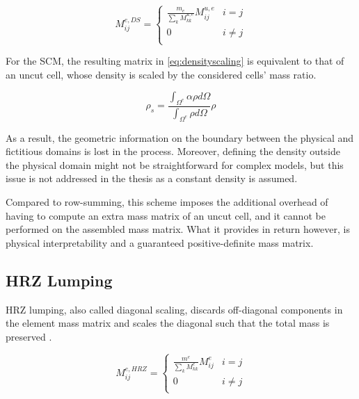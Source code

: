 \begin{equation} \label{eq:densityscaling}
	M_{ij}^{e,DS} = \left\{ \begin{array}{ll}
		\frac{m_e}{\sum_k M_{kk}^{u,e}} M_{ij}^{u,e} & i = j \\
		0 & i \neq j \\
	\end{array} \right.
\end{equation}

For the SCM, the resulting matrix in \ref{eq:densityscaling} is equivalent
to that of an uncut cell, whose density is scaled by the considered cells' mass ratio.

\begin{equation} \label{eq:scaleddensity}
	\rho_s = \frac{\int_{\Omega^e} \alpha \rho d\Omega}{\int_{\Omega^e} \rho d\Omega} \rho
\end{equation}

As a result, the geometric information on the boundary between the physical
and fictitious domains is lost in the process. Moreover, defining the density
outside the physical domain might not be straightforward for complex models, but
this issue is not addressed in the thesis as a constant density is assumed.

Compared to row-summing, this scheme imposes the additional overhead of having
to compute an extra mass matrix of an uncut cell, and it cannot be performed
on the assembled mass matrix. What it provides in return however, is physical
interpretability and a guaranteed positive-definite mass matrix.

%
\subsection{HRZ Lumping}
\label{section:hrzlumping}
%

HRZ lumping, also called diagonal scaling, discards off-diagonal components in the
element mass matrix and scales the diagonal such that the total mass is preserved \cite{Hinton1976}.

\begin{equation} \label{eq:hrzlumping}
	M_{ij}^{e,HRZ} = \left\{ \begin{array}{ll}
		\frac{m^e}{\sum_k M_{kk}^e} M_{ij}^e & i=j \\
		0 & i \neq j \\
	\end{array} \right.
\end{equation}

